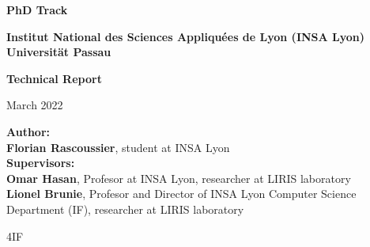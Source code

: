 \begin{titlepage}
    \begin{center}
        \vspace{1cm}
        \Large
        \textbf{PhD Track}

        \vspace{0.5cm}
        \normalsize
        \textbf{Institut National des Sciences Appliquées de Lyon (INSA Lyon)}\\
        \textbf{Universität Passau}

        \vspace{2cm}
        \Huge
        \textbf{Technical Report}

        \vspace{1cm}
        \Large
        March 2022
        
        \vspace{2cm}

        \Large
        \textbf{Author:}\\
        \normalsize
        \textbf{Florian Rascoussier}, student at INSA Lyon\\

        \vspace{0.5cm}
        \Large
        \textbf{Supervisors:}\\

        \vspace{0.5cm}
        \normalsize
        \textbf{Omar Hasan}, Profesor at INSA Lyon, researcher at LIRIS laboratory\\
        \textbf{Lionel Brunie}, Profesor and Director of INSA Lyon Computer Science Department (IF), researcher at LIRIS laboratory\\
        
        
        
        \vfill
        
        \LARGE
        4IF
            
    \end{center}
\end{titlepage}